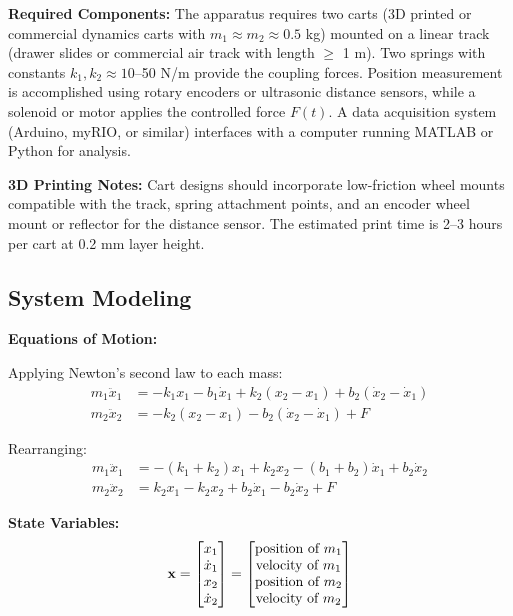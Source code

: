 \textbf{Required Components:}
The apparatus requires two carts (3D printed or commercial dynamics carts with $m_1 \approx m_2 \approx 0.5$ kg) mounted on a linear track (drawer slides or commercial air track with length $\geq$ 1 m). Two springs with constants $k_1, k_2 \approx 10$--50 N/m provide the coupling forces. Position measurement is accomplished using rotary encoders or ultrasonic distance sensors, while a solenoid or motor applies the controlled force $F(t)$. A data acquisition system (Arduino, myRIO, or similar) interfaces with a computer running MATLAB or Python for analysis.

\textbf{3D Printing Notes:}
Cart designs should incorporate low-friction wheel mounts compatible with the track, spring attachment points, and an encoder wheel mount or reflector for the distance sensor. The estimated print time is 2--3 hours per cart at 0.2 mm layer height.

\subsection{System Modeling}

\textbf{Equations of Motion:}

Applying Newton's second law to each mass:
\begin{align}
    m_1\ddot{x}_1 &= -k_1 x_1 - b_1\dot{x}_1 + k_2(x_2-x_1) + b_2(\dot{x}_2-\dot{x}_1) \\
    m_2\ddot{x}_2 &= -k_2(x_2-x_1) - b_2(\dot{x}_2-\dot{x}_1) + F
\end{align}

Rearranging:
\begin{align}
    m_1\ddot{x}_1 &= -(k_1+k_2)x_1 + k_2 x_2 - (b_1+b_2)\dot{x}_1 + b_2\dot{x}_2 \\
    m_2\ddot{x}_2 &= k_2 x_1 - k_2 x_2 + b_2\dot{x}_1 - b_2\dot{x}_2 + F
\end{align}

\textbf{State Variables:}
\begin{equation}
    \mathbf{x} = \begin{bmatrix} x_1 \\ \dot{x}_1 \\ x_2 \\ \dot{x}_2 \end{bmatrix} =
    \begin{bmatrix} \text{position of } m_1 \\ \text{velocity of } m_1 \\ \text{position of } m_2 \\ \text{velocity of } m_2 \end{bmatrix}
\end{equation}

